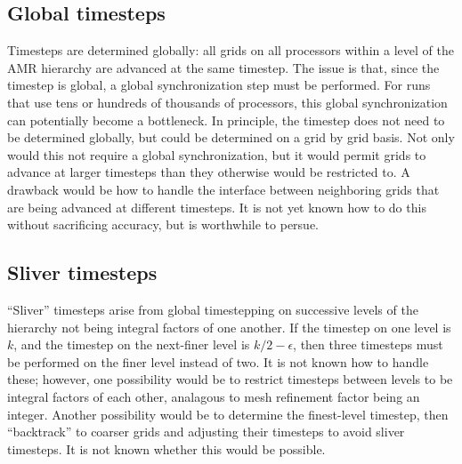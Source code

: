 \documentclass{article}
\begin{document}
\subsection{Global timesteps} \label{issue:method-timestep-global}


  Timesteps are determined globally: all grids on all processors
  within a level of the AMR hierarchy are advanced at the same
  timestep.  The issue is that, since the timestep is global, a global
  synchronization step must be performed.  For runs that use tens or
  hundreds of thousands of processors, this global synchronization can
  potentially become a bottleneck.  In principle, the timestep does
  not need to be determined globally, but could be determined on a
  grid by grid basis.  Not only would this not require a global
  synchronization, but it would permit grids to advance at larger
  timesteps than they otherwise would be restricted to.  A drawback
  would be how to handle the interface between neighboring grids that
  are being advanced at different timesteps.  It is not yet known how
  to do this without sacrificing accuracy, but is worthwhile to
  persue.

\subsection{Sliver timesteps} \label{issue:method-timestep-sliver}

  ``Sliver'' timesteps arise from global timestepping on successive
  levels of the hierarchy not being integral factors of one another.
  If the timestep on one level is $k$, and the timestep on the
  next-finer level is $k/2-\epsilon$, then three timesteps must be
  performed on the finer level instead of two.  It is not known how to
  handle these; however, one possibility would be to restrict
  timesteps between levels to be integral factors of each other,
  analagous to mesh refinement factor being an integer.  Another
  possibility would be to determine the finest-level timestep, then
  ``backtrack'' to coarser grids and adjusting their timesteps to
  avoid sliver timesteps.  It is not known whether this would be
  possible.
\end{document}
